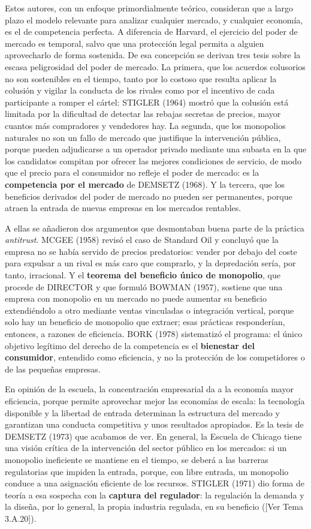 \documentclass[10pt,a4paper]{article}
\newcommand{\authorfont}[1]{{\fontfamily{EBGaramond-TLF}\selectfont #1}}
\begin{document}
Estos autores, con un enfoque primordialmente teórico, consideran que a largo plazo el modelo relevante para analizar cualquier mercado, y cualquier economía, es el de competencia perfecta. A diferencia de Harvard, el ejercicio del poder de mercado es temporal, salvo que una protección legal permita a alguien aprovecharlo de forma sostenida. De esa concepción se derivan tres tesis sobre la escasa peligrosidad del poder de mercado. La primera, que los acuerdos colusorios no son sostenibles en el tiempo, tanto por lo costoso que resulta aplicar la colusión y vigilar la conducta de los rivales como por el incentivo de cada participante a romper el cártel: STIGLER (1964) mostró que la colusión está limitada por la dificultad de detectar las rebajas secretas de precios, mayor cuantos más compradores y vendedores hay. La segunda, que los monopolios naturales no son un fallo de mercado que justifique la intervención pública, porque pueden adjudicarse a un operador privado mediante una subasta en la que los candidatos compitan por ofrecer las mejores condiciones de servicio, de modo que el precio para el consumidor no refleje el poder de mercado: es la \textbf{competencia por el mercado} de DEMSETZ (1968). Y la tercera, que los beneficios derivados del poder de mercado no pueden ser permanentes, porque atraen la entrada de nuevas empresas en los mercados rentables.

A ellas se añadieron dos argumentos que desmontaban buena parte de la práctica \textit{antitrust}. MCGEE (1958) revisó el caso de Standard Oil y concluyó que la empresa no se había servido de precios predatorios: vender por debajo del coste para expulsar a un rival es más caro que comprarlo, y la depredación sería, por tanto, irracional. Y el \textbf{teorema del beneficio único de monopolio}, que procede de DIRECTOR y que formuló BOWMAN (1957), sostiene que una empresa con monopolio en un mercado no puede aumentar su beneficio extendiéndolo a otro mediante ventas vinculadas o integración vertical, porque solo hay un beneficio de monopolio que extraer; esas prácticas responderían, entonces, a razones de eficiencia. BORK (1978) sistematizó el programa: el único objetivo legítimo del derecho de la competencia es el \textbf{bienestar del consumidor}, entendido como eficiencia, y no la protección de los competidores o de las pequeñas empresas.

En opinión de la escuela, la concentración empresarial da a la economía mayor eficiencia, porque permite aprovechar mejor las economías de escala: la tecnología disponible y la libertad de entrada determinan la estructura del mercado y garantizan una conducta competitiva y unos resultados apropiados. Es la tesis de DEMSETZ (1973) que acabamos de ver. En general, la Escuela de Chicago tiene una visión crítica de la intervención del sector público en los mercados: si un monopolio ineficiente se mantiene en el tiempo, se deberá a las barreras regulatorias que impiden la entrada, porque, con libre entrada, un monopolio conduce a una asignación eficiente de los recursos. STIGLER (1971) dio forma de teoría a esa sospecha con la \textbf{captura del regulador}: la regulación la demanda y la diseña, por lo general, la propia industria regulada, en su beneficio ([\authorfont{Ver Tema 3.A.20}]).
\end{document}
